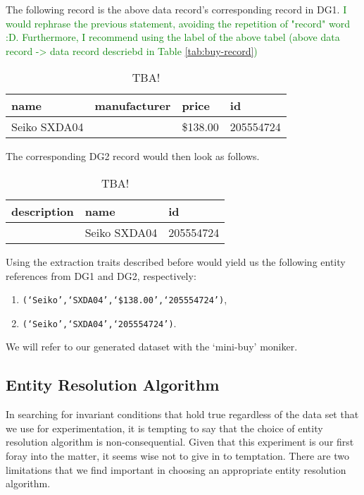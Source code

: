 The following record is the above data record's corresponding record in DG1. 
\textcolor{green}{I would rephrase the previous statement, avoiding the repetition of "record" word :D. Furthermore, I recommend using the label of the above tabel (above data record -> data record descriebd in Table \ref{tab:buy-record})}


\begin{table}[ht]
    \setlength\tabcolsep{6pt}
    \begin{tabular}{|l|l|l|l|}
        \hline
        name & manufacturer & price & id \\
        \hline
        Seiko SXDA04 & & \$138.00 & 205554724 \\
        \hline
    \end{tabular}
    \label{tab:dg1-record}
    \caption{TBA!}
\end{table}

The corresponding DG2 record would then look as follows.

\begin{table}[ht]
    \setlength\tabcolsep{5pt}
    \begin{tabular}[b]{|l|l|l|}
        \hline
        description&name&id \\
        \hline
        &Seiko SXDA04&205554724 \\
        \hline
    \end{tabular}
    \label{tab:dg2-record}
    \caption{TBA!}
\end{table}

Using the extraction traits described before would yield us the
following entity references from DG1 and DG2, respectively:
\begin{enumerate}
    \item \texttt{(`Seiko',`SXDA04',`\$138.00',`205554724')},
    \item \texttt{(`Seiko',`SXDA04',`205554724')}.
\end{enumerate}

We will refer to our generated dataset with the `mini-buy' moniker.

\subsection{Entity Resolution Algorithm}\label{subsec:entity-resolution-algorithm}

In searching for invariant conditions that hold true regardless of the data set
that we use for experimentation, it is tempting to say that the choice of entity
resolution algorithm is non-consequential.
Given that this experiment is our first foray into the matter, it seems wise not
to give in to temptation.
There are two limitations that we find important in choosing an appropriate
entity resolution algorithm.

